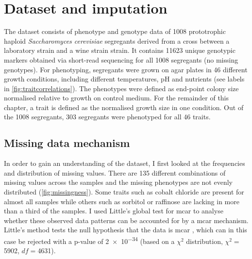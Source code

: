 \section{Dataset and imputation}
The dataset consists of phenotype and genotype data of \num{1008} prototrophic haploid \emph{Saccharomyces cerevisiae} segregants derived from a cross between a laboratory strain and a wine strain strain. It contains \num{11623} unique genotypic markers obtained via short-read sequencing for all \num{1008} segregants (no missing genotypes). For phenotyping, segregants were grown on agar plates in \num{46} different growth conditions, including different temperatures, pH and nutrients (see labels in \cref{fig:traitcorrelations}). The phenotypes were defined as end-point colony size normalised relative to growth on control medium. For the remainder of this chapter, a trait is defined as the normalised growth size in one condition. Out of the \num{1008} segregants, \num{303} segregants were phenotyped for all \num{46} traits.

\subsection{Missing data mechanism} 
In order to gain an understanding of the dataset, I first looked at the frequencies and distribution of missing values. There are \num{135} different combinations of missing values across the samples and the missing phenotypes are not evenly distributed (\cref{fig:missingness}). Some traits such as cobalt chloride are present for almost all samples while others such as sorbitol or raffinose are lacking in more than a third of the samples. I used Little's global test for \gls{mcar} to analyse whether these observed data patterns can be accounted for by a \gls{mcar} mechanism. Little's method tests the null hypothesis that the data is \gls{mcar} \citep{Little1988,Beaujean2015}, which can in this case be rejected with a p-value of \num{2e-34} (based on a \(\chi^2\) distribution, \(\chi^2=\)\num{5902}, \(df=\)\num{4631}). 

